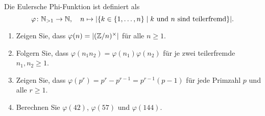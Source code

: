 \begin{question}[subtitle = Die Eulersche Phi-Funktion]
  Die Eulersche Phi-Funktion ist definiert als
  \[
            \varphi
    \colon  \mathbb{N}_{>1} \to \mathbb{N},
    \quad   n \mapsto |\{ k \in \{1, \dotsc, n\} \mid \text{$k$ und $n$ sind teilerfremd} \}|.
  \]
  \begin{enumerate}
    \item
      Zeigen Sie, dass $\varphi(n) = | (\mathbb{Z}/n)^\times |$ für alle $n \geq 1$.
    \item
      Folgern Sie, dass $\varphi(n_1 n_2) = \varphi(n_1) \varphi(n_2)$ für je zwei teilerfremde $n_1, n_2 \geq 1$.
    \item
      Zeigen Sie, dass $\varphi(p^r) = p^r - p^{r-1} = p^{r-1} (p - 1)$ für jede Primzahl $p$ und alle $r \geq 1$.
    \item
      Berechnen Sie $\varphi(42)$, $\varphi(57)$ und $\varphi(144)$.
  \end{enumerate}
\end{question}


